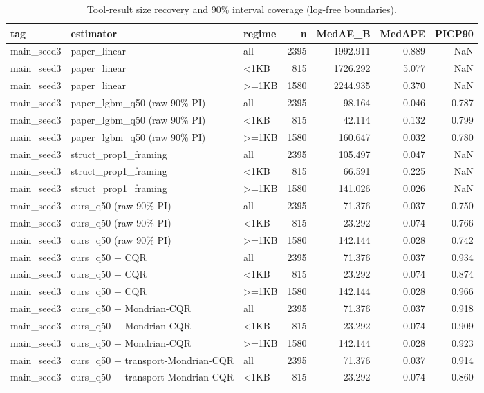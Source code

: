 \begin{table}
\caption{Tool-result size recovery and 90\% interval coverage (log-free boundaries).}
\label{tab:size}
\begin{tabular}{lllrrrr}
\toprule
tag & estimator & regime & n & MedAE\_B & MedAPE & PICP90 \\
\midrule
main\_seed3 & paper\_linear & all & 2395 & 1992.911 & 0.889 & NaN \\
main\_seed3 & paper\_linear & <1KB & 815 & 1726.292 & 5.077 & NaN \\
main\_seed3 & paper\_linear & >=1KB & 1580 & 2244.935 & 0.370 & NaN \\
main\_seed3 & paper\_lgbm\_q50 (raw 90\% PI) & all & 2395 & 98.164 & 0.046 & 0.787 \\
main\_seed3 & paper\_lgbm\_q50 (raw 90\% PI) & <1KB & 815 & 42.114 & 0.132 & 0.799 \\
main\_seed3 & paper\_lgbm\_q50 (raw 90\% PI) & >=1KB & 1580 & 160.647 & 0.032 & 0.780 \\
main\_seed3 & struct\_prop1\_framing & all & 2395 & 105.497 & 0.047 & NaN \\
main\_seed3 & struct\_prop1\_framing & <1KB & 815 & 66.591 & 0.225 & NaN \\
main\_seed3 & struct\_prop1\_framing & >=1KB & 1580 & 141.026 & 0.026 & NaN \\
main\_seed3 & ours\_q50 (raw 90\% PI) & all & 2395 & 71.376 & 0.037 & 0.750 \\
main\_seed3 & ours\_q50 (raw 90\% PI) & <1KB & 815 & 23.292 & 0.074 & 0.766 \\
main\_seed3 & ours\_q50 (raw 90\% PI) & >=1KB & 1580 & 142.144 & 0.028 & 0.742 \\
main\_seed3 & ours\_q50 + CQR & all & 2395 & 71.376 & 0.037 & 0.934 \\
main\_seed3 & ours\_q50 + CQR & <1KB & 815 & 23.292 & 0.074 & 0.874 \\
main\_seed3 & ours\_q50 + CQR & >=1KB & 1580 & 142.144 & 0.028 & 0.966 \\
main\_seed3 & ours\_q50 + Mondrian-CQR & all & 2395 & 71.376 & 0.037 & 0.918 \\
main\_seed3 & ours\_q50 + Mondrian-CQR & <1KB & 815 & 23.292 & 0.074 & 0.909 \\
main\_seed3 & ours\_q50 + Mondrian-CQR & >=1KB & 1580 & 142.144 & 0.028 & 0.923 \\
main\_seed3 & ours\_q50 + transport-Mondrian-CQR & all & 2395 & 71.376 & 0.037 & 0.914 \\
main\_seed3 & ours\_q50 + transport-Mondrian-CQR & <1KB & 815 & 23.292 & 0.074 & 0.860 \\

\end{tabular}
\end{table}
